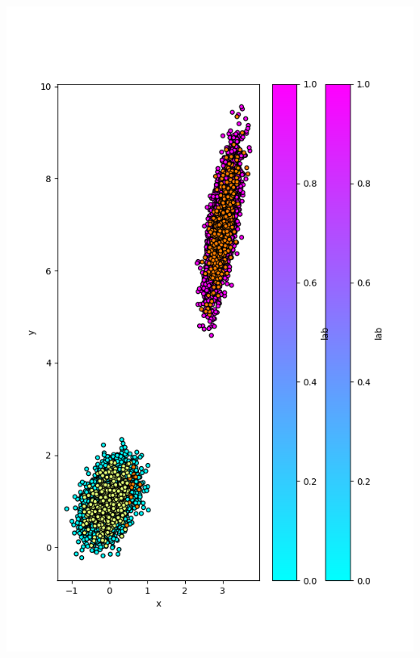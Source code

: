 \documentclass{article}
\begin{document}
\begin{enumerate}
  \noindent\includegraphics[scale=0.5]{plot_100}

\end{enumerate}
\end{document}
